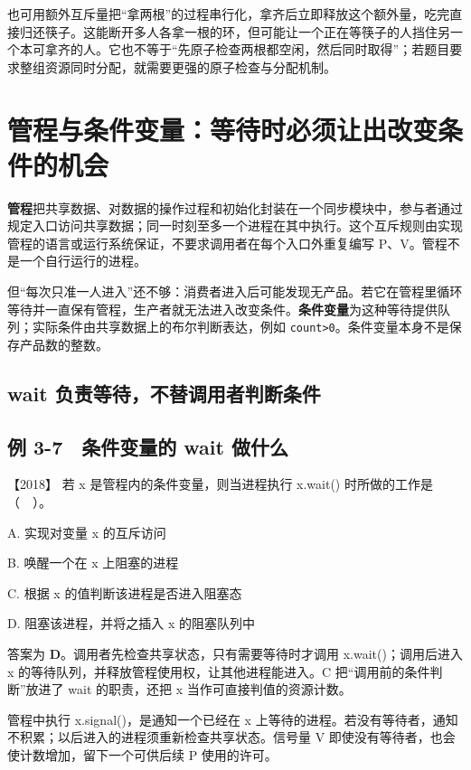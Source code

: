 也可用额外互斥量把``拿两根''的过程串行化，拿齐后立即释放这个额外量，吃完直接归还筷子。这能断开多人各拿一根的环，但可能让一个正在等筷子的人挡住另一个本可拿齐的人。它也不等于``先原子检查两根都空闲，然后同时取得''；若题目要求整组资源同时分配，就需要更强的原子检查与分配机制。

\section{管程与条件变量：等待时必须让出改变条件的机会}\label{sec-monitor}

\textbf{管程}把共享数据、对数据的操作过程和初始化封装在一个同步模块中，参与者通过规定入口访问共享数据；同一时刻至多一个进程在其中执行。这个互斥规则由实现管程的语言或运行系统保证，不要求调用者在每个入口外重复编写 P、V。管程不是一个自行运行的进程。

但``每次只准一人进入''还不够：消费者进入后可能发现无产品。若它在管程里循环等待并一直保有管程，生产者就无法进入改变条件。\textbf{条件变量}为这种等待提供队列；实际条件由共享数据上的布尔判断表达，例如 \allowbreak{}\texttt{count\textgreater{}0}。条件变量本身不是保存产品数的整数。

\subsection{wait 负责等待，不替调用者判断条件}\label{os-c03-h483}

\subsection{例 3-7　条件变量的 wait 做什么}\label{ex-2018}

\noindent{}【2018】 若 x 是管程内的条件变量，则当进程执行 x.wait() 时所做的工作是（　）。

A. 实现对变量 x 的互斥访问

B. 唤醒一个在 x 上阻塞的进程

C. 根据 x 的值判断该进程是否进入阻塞态

D. 阻塞该进程，并将之插入 x 的阻塞队列中

答案为 \textbf{D}。调用者先检查共享状态，只有需要等待时才调用 x.wait()；调用后进入 x 的等待队列，并释放管程使用权，让其他进程能进入。C 把``调用前的条件判断''放进了 wait 的职责，还把 x 当作可直接判值的资源计数。

管程中执行 x.signal()，是通知一个已经在 x 上等待的进程。若没有等待者，通知不积累；以后进入的进程须重新检查共享状态。信号量 V 即使没有等待者，也会使计数增加，留下一个可供后续 P 使用的许可。


